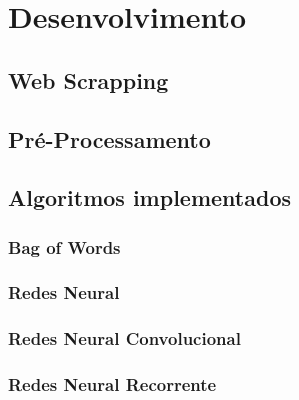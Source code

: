 \chapter{Desenvolvimento}
\noindent
\section{Web Scrapping}
\section{Pré-Processamento}

\section{Algoritmos implementados}
\subsection{Bag of Words}
\subsection{Redes Neural}
\subsection{Redes Neural Convolucional}
\subsection{Redes Neural Recorrente}